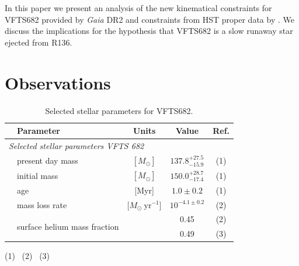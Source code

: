 \documentclass[apjl,twocolumn]{emulateapj}
\begin{document}

In this paper we present an analysis of the new kinematical
constraints for VFTS682 provided by \emph{Gaia} DR2 and constraints
from HST proper data  by \citet{platais:18}.   We discuss the
implications for the hypothesis that VFTS682 is a slow runaway star
ejected from R136.




\section{Observations}
\label{sec:sample}


\begin{table}
  \begin{center}
    \caption{Selected stellar parameters for VFTS682. }
    \begin{tabular}{llc|c|c}
      \hline
      \hline
      &Parameter & Units & Value & Ref.\\
     
       \hline
       \multicolumn{5}{l}{\emph{Selected stellar parameters VFTS 682}}
      \\
      \hline
     & present day mass  & $[M_\odot]$ & $137.8^{+27.5}_
                                           {-15.9}$ & (1)
                                                    \\
      & initial mass& $[M_\odot]$ & $150.0^{+28.7}_{-17.4}$ & (1)
      \\
      &age & [Myr] & $1.0\pm0.2$ & (1) \\
      &mass loss rate & [$M_\odot \ \mathrm{yr}^{-1}$] & $10^{-4.1\pm0.2}$ & (2)\\
      &\multirow{2}{*}{surface helium mass fraction} &  & 0.45 & (2)\\
      & &  & 0.49 & (3)\\
      \hline

    \end{tabular}
    \tablecomments
    { 
      (1)~\cite{schneider:18}
      (2)~\cite{bestenlehner:11}
      (3)~\cite{rubio-diez:17}
    }
  \end{center}
  \label{tab:star_param}
\end{table}
\end{document}
